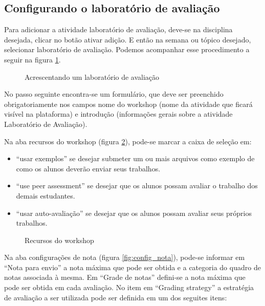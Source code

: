 \subsection{Configurando o laboratório de avaliação}
Para adicionar a atividade laboratório de avaliação, deve-se na disciplina desejada, clicar no botão ativar adição. E então na semana ou tópico desejado, selecionar laboratório de avaliação. Podemos acompanhar esse procedimento a seguir na figura \ref{fig:config_lab}.

\begin{figure}
 \begin{center}
  \caption{Acrescentando um laboratório de avaliação}
  \label{fig:config_lab}
 \end{center}
\end{figure}

No passo seguinte encontra-se um formulário, que deve ser preenchido obrigatoriamente nos campos nome do workshop (nome da atividade que ficará visível na plataforma) e introdução (informações gerais sobre a atividade Laboratório de Avaliação).

Na aba recursos do workshop (figura \ref{fig:recursos_work}), pode-se marcar a caixa de seleção em:

\begin{itemize}
 \item “usar exemplos” se desejar submeter um ou mais arquivos como exemplo de como os alunos deverão enviar seus trabalhos.
 \item “use peer assessment” se desejar que os alunos possam avaliar o trabalho dos demais estudantes.
 \item “usar auto-avaliação” se desejar que os alunos possam avaliar seus próprios trabalhos.
\end{itemize}

\begin{figure}
 \begin{center}
  \caption{Recursos do workshop}
  \label{fig:recursos_work}
 \end{center}
\end{figure}

Na aba configurações de nota (figura \ref{fig:config_nota}), pode-se informar em “Nota para envio” a nota máxima que pode ser obtida e a categoria do quadro de notas associada à mesma. Em “Grade de notas” defini-se a nota máxima que pode ser obtida em cada avaliação. No item em “Grading strategy” a estratégia de avaliação a ser utilizada pode ser definida em um dos seguites itens:

